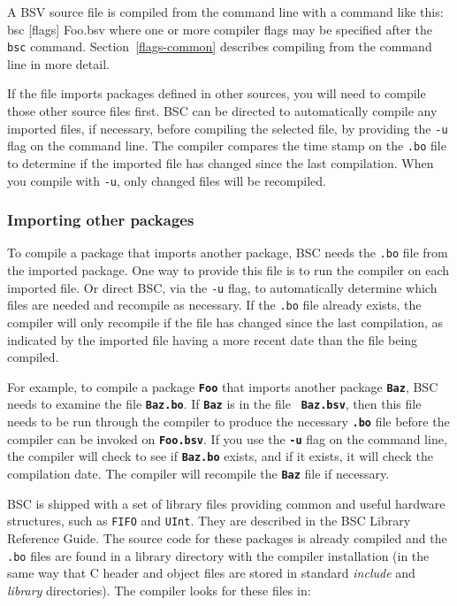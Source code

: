 \documentclass{article}
\newcommand{\te}[1]{\texttt{#1}}
\newenvironment{centerboxverbatim}
  {\center
   \boxedverbatim}
  {\endboxedverbatim
  {\endcenter }}
\begin{document}
A BSV source file is compiled from the command line with a command like this:
\begin{centerboxverbatim}
bsc [flags] Foo.bsv
\end{centerboxverbatim}
where one or more compiler flags may be specified after the \te{bsc} command.
Section~\ref{flags-common} describes compiling from the command line
in more detail.

If the file imports packages defined in other sources, you will need to
compile those other source files first.  BSC can be directed to
automatically compile any imported files, if necessary, before compiling
the selected file, by providing the \te{-u} flag on the command line.
The compiler compares the time stamp on the \te{.bo} file
to determine if the imported file has changed since the last
compilation.  When you compile with \te{-u}, only changed files
will be recompiled.


\subsubsection{Importing other packages}
\label{sec-import-packages}

To compile a package that imports another package,
BSC needs the \te{.bo} file from the imported
package.  One way to provide this file is to run the compiler on
each imported file. Or direct BSC, via the \te{-u} flag, to
automatically determine which files are needed and recompile as
necessary.
If the \te{.bo} file already exists, the compiler will
only recompile if the file has changed since the last compilation, as indicated
by the imported file having a more recent date than the file being compiled.

For example, to compile  a package {\bf\tt Foo} that imports another package
{\bf\tt Baz}, BSC needs to examine the file {\bf\tt Baz.bo}. If {\bf\tt Baz} is in the file {\bf\tt
Baz.bsv},  then this file needs to be run
through the compiler to produce the necessary  {\bf\tt .bo}
file before the compiler can be invoked on {\bf\tt Foo.bsv}.
If you  use the {\bf\tt -u} flag on the command line,
the compiler will check to see if {\bf\tt Baz.bo} exists,
and if it exists, it will check the compilation date.
The compiler will recompile the {\bf\tt Baz} file if necessary.

BSC is shipped with a set of library files providing common
and useful hardware structures, such as
\te{FIFO} and \te{UInt}.  They are  described in the BSC Library
Reference Guide.   The source code for these packages is already
compiled and the  \te{.bo} files are
found in a library directory with the compiler installation (in
the same way that C header and object files are stored in standard
\emph{include} and \emph{library} directories). The compiler looks for
these files in:
\end{document}
